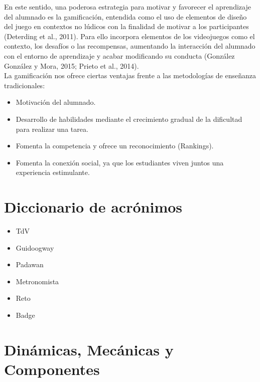 En este sentido, una poderosa estrategia para motivar y favorecer el aprendizaje del alumnado es la gamificación, entendida como el uso de elementos de diseño del juego en contextos no lúdicos con la finalidad de motivar a los participantes (Deterding et al., 2011). Para ello incorpora elementos de los videojuegos como el contexto, los desafíos o las recompensas, aumentando la interacción del alumnado con el entorno de aprendizaje y acabar modificando su conducta (González González y Mora, 2015; Prieto et al., 2014).\\


La gamificación nos ofrece ciertas ventajas frente a las metodologías de enseñanza tradicionales:\\

\begin{itemize}
\item Motivación del alumnado.
\item Desarrollo de habilidades mediante el crecimiento gradual de la dificultad para realizar una tarea.
\item Fomenta la competencia y ofrece un reconocimiento (Rankings).
\item Fomenta la conexión social, ya que los estudiantes viven juntos una experiencia estimulante.
\end{itemize}

\section{Diccionario de acrónimos}
\begin{itemize}
\item \ac{TdV}
\item \ac{Guidoogway}
\item \ac{Padawan}
\item \ac{Metronomista}
\item \ac{Reto}
\item \ac{Badge}
\end{itemize}

\newpage

\section{Dinámicas, Mecánicas y Componentes \cite{Introduccion1}}

